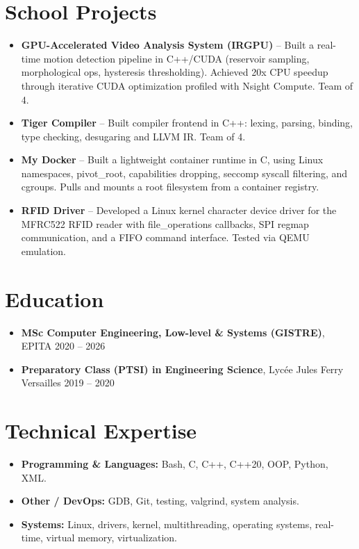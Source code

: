 \documentclass[9pt,a4paper]{article}
\begin{document}
\section*{School Projects}
\begin{tcolorbox}[mybox]
\begin{itemize}
\item \textbf{GPU-Accelerated Video Analysis System (IRGPU)} -- Built a real-time motion detection pipeline in C++/CUDA (reservoir sampling, morphological ops, hysteresis thresholding). Achieved 20x CPU speedup through iterative CUDA optimization profiled with Nsight Compute. Team of 4.

\item \textbf{Tiger Compiler} -- Built compiler frontend in C++: lexing, parsing, binding, type checking, desugaring and LLVM IR. Team of 4.

\item \textbf{My Docker} -- Built a lightweight container runtime in C, using Linux namespaces, pivot\_root, capabilities dropping, seccomp syscall filtering, and cgroups. Pulls and mounts a root filesystem from a container registry.

\item \textbf{RFID Driver} -- Developed a Linux kernel character device driver for the MFRC522 RFID reader with file\_operations callbacks, SPI regmap communication, and a FIFO command interface. Tested via QEMU emulation.
\end{itemize}
\end{tcolorbox}


\section*{Education}
\begin{tcolorbox}[mybox]
\begin{itemize}
\item \textbf{MSc Computer Engineering, Low-level \& Systems (GISTRE)}, EPITA {\small{\hfill 2020 – 2026}}

\item \textbf{Preparatory Class (PTSI) in Engineering Science}, Lycée Jules Ferry Versailles {\small{\hfill 2019 – 2020}}
\end{itemize}
\end{tcolorbox}


\section*{Technical Expertise}
\begin{tcolorbox}[mybox]
\begin{itemize}
\item \textbf{Programming \& Languages:} Bash, C, C++, C++20, OOP, Python, XML.

\item \textbf{Other / DevOps:} GDB, Git, testing, valgrind, system analysis.

\item \textbf{Systems:} Linux, drivers, kernel, multithreading, operating systems, real-time, virtual memory, virtualization.
\end{itemize}
\end{tcolorbox}
\end{document}
